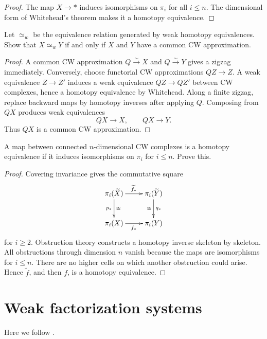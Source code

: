 \begin{proof}
The map $X\to*$ induces isomorphisms on
$\pi_i$ for all $i\leq n$.
The dimensional form of Whitehead's theorem
makes it a homotopy equivalence.
\end{proof}

\begin{exercise}
Let $\simeq_w$ be the equivalence relation
generated by weak homotopy equivalences.
Show that $X\simeq_wY$ if and only if $X$
and $Y$ have a common CW approximation.
\end{exercise}

\begin{proof}
A common CW approximation
$Q\xrightarrow{\sim}X$ and
$Q\xrightarrow{\sim}Y$
gives a zigzag immediately.
Conversely, choose functorial CW
approximations $QZ\to Z$. A weak
equivalence $Z\to Z'$ induces a weak
equivalence $QZ\to QZ'$ between CW
complexes, hence a homotopy equivalence by
Whitehead. Along a finite zigzag, replace
backward maps by homotopy inverses after
applying $Q$. Composing from $QX$
produces weak equivalences
$$
QX\longrightarrow X,
\qquad
QX\longrightarrow Y.
$$
Thus $QX$ is a common CW approximation.
\end{proof}

\begin{exercise}
A map between connected $n$-dimensional CW
complexes is a homotopy equivalence if it
induces isomorphisms on $\pi_i$ for
$i\leq n$. Prove this.
\end{exercise}

\begin{proof}
Covering invariance gives the commutative
square
$$
\xymatrix{
\pi_i(\widetilde X)
 \ar[r]^{\widetilde f_*}
 \ar[d]_{p_*}^{\cong}
&\pi_i(\widetilde Y)
 \ar[d]^{q_*}_{\cong}\\
\pi_i(X)\ar[r]_{f_*}
&\pi_i(Y)
}
$$
for $i\geq2$. Obstruction theory constructs
a homotopy inverse skeleton by skeleton.
All obstructions through dimension $n$
vanish because the maps are isomorphisms
for $i\leq n$. There are no higher cells on
which another obstruction could arise.
Hence $\widetilde f$, and then $f$, is a
homotopy equivalence.
\end{proof}

\section{Weak factorization systems}
\label{section-weak-factorization-systems}

Here we follow \cite{Riehl}.

